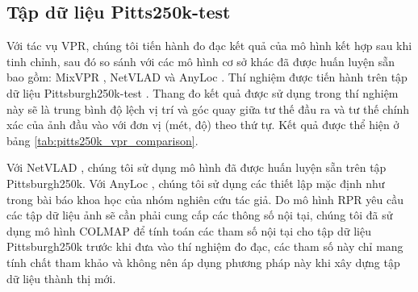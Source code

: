 \subsection*{Tập dữ liệu Pitts250k-test}
Với tác vụ VPR, chúng tôi tiến hành đo đạc kết quả của mô hình kết hợp sau khi tinh chỉnh, sau đó so sánh với các mô hình cơ sở khác đã được huấn luyện sẵn bao gồm: MixVPR \cite{alibey2023mixvpr}, NetVLAD \cite{arandjelovic2016netvlad} và AnyLoc \cite{keetha2023anyloc}. Thí nghiệm được tiến hành trên tập dữ liệu Pittsburgh250k-test \cite{6618963}. Thang đo kết quả được sử dụng trong thí nghiệm này sẽ là trung bình độ lệch vị trí và góc quay giữa tư thế đầu ra và tư thế chính xác của ảnh đầu vào với đơn vị (mét, độ) theo thứ tự. Kết quả được thể hiện ở bảng \ref{tab:pitts250k_vpr_comparison}.

Với NetVLAD \cite{arandjelovic2016netvlad}, chúng tôi sử dụng mô hình đã được huấn luyện sẵn trên tập Pittsburgh250k. Với AnyLoc \cite{keetha2023anyloc}, chúng tôi sử dụng các thiết lập mặc định như trong bài báo khoa học của nhóm nghiên cứu tác giả. Do mô hình RPR yêu cầu các tập dữ liệu ảnh sẽ cần phải cung cấp các thông số nội tại, chúng tôi đã sử dụng mô hình COLMAP\cite{schoenberger2016sfm} để tính toán các tham số nội tại cho tập dữ liệu Pittsburgh250k trước khi đưa vào thí nghiệm đo đạc, các tham số này chỉ mang tính chất tham khảo và không nên áp dụng phương pháp này khi xây dựng tập dữ liệu thành thị mới.

